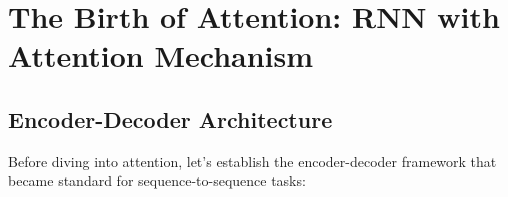 
\section{The Birth of Attention: RNN with Attention Mechanism}

\subsection{Encoder-Decoder Architecture}

Before diving into attention, let's establish the encoder-decoder framework that became standard for sequence-to-sequence tasks:

